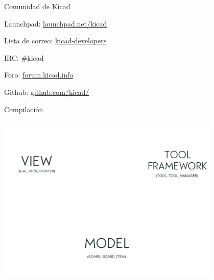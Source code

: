 

\begin{frame}{Comunidad de Kicad}
	\begin{fullpageitemize}
		\item[\faCode] Launchpad: \href{https://launchpad.net/kicad}{launchpad.net/kicad}
		\pause
		\item[\faEnvelope] Lista de correo: \href{http://lists.launchpad.net/kicad-developers}{kicad-developers}
		\pause
		\item[\faHashtag] IRC: \#kicad
		\pause
		\item[\faUsers] Foro: \href{https://forum.kicad.info/}{forum.kicad.info}
		\pause
		\item[\faGithub] Github: \href{https://github.com/kicad/}{github.com/kicad/}
	\end{fullpageitemize}
\end{frame}


\begin{frame}{Compilación}
	\inputminted[fontsize=\large]{bash}{code/get-kicad.sh}
\end{frame}



\begin{frame}
	\centering
	\includegraphics[width=0.8\textwidth]{gfx/tool_framework.png}
\end{frame}


